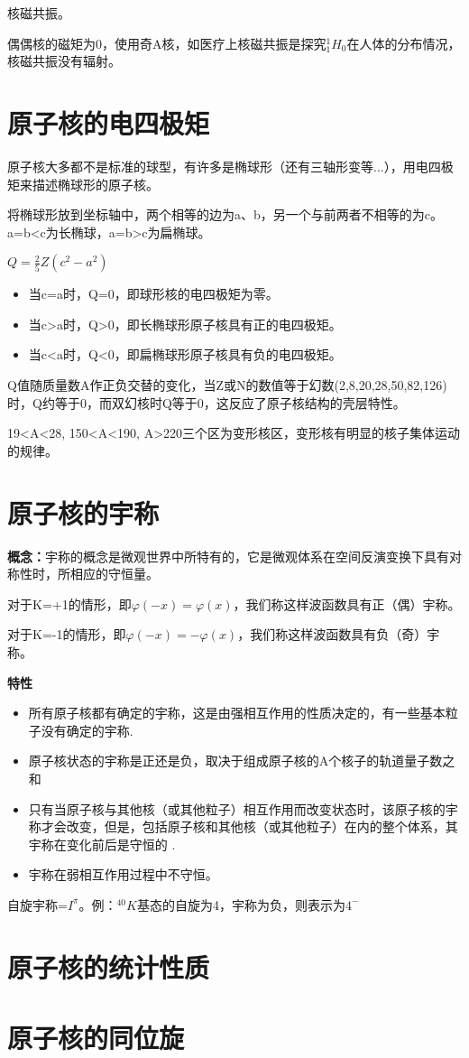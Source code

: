 核磁共振。

偶偶核的磁矩为0，使用奇A核，如医疗上核磁共振是探究$^1_1H_0$在人体的分布情况，核磁共振没有辐射。

\section{原子核的电四极矩}

原子核大多都不是标准的球型，有许多是椭球形（还有三轴形变等...），用电四极矩来描述椭球形的原子核。

将椭球形放到坐标轴中，两个相等的边为a、b，另一个与前两者不相等的为c。a=b<c为长椭球，a=b>c为扁椭球。

$Q=\frac{2}{5}Z(c^2-a^2)$

\begin{itemize}
    \item 当c=a时，Q=0，即球形核的电四极矩为零。
    \item 当c>a时，Q>0，即长椭球形原子核具有正的电四极矩。
    \item 当c<a时，Q<0，即扁椭球形原子核具有负的电四极矩。
\end{itemize}

Q值随质量数A作正负交替的变化，当Z或N的数值等于幻数(2,8,20,28,50,82,126)时，Q约等于0，而双幻核时Q等于0，这反应了原子核结构的壳层特性。

19<A<28, 150<A<190, A>220三个区为变形核区，变形核有明显的核子集体运动的规律。

\section{原子核的宇称}

\textbf{概念：}宇称的概念是微观世界中所特有的，它是微观体系在空间反演变换下具有对称性时，所相应的守恒量。

对于K=+1的情形，即$\varphi (-x) = \varphi (x)$，我们称这样波函数具有正（偶）宇称。

对于K=-1的情形，即$\varphi (-x) = -\varphi (x)$，我们称这样波函数具有负（奇）宇称。

\textbf{特性}

\begin{itemize}
    \item 所有原子核都有确定的宇称，这是由强相互作用的性质决定的，有一些基本粒子没有确定的宇称.
    \item 原子核状态的宇称是正还是负，取决于组成原子核的A个核子的轨道量子数之和
    \item 只有当原子核与其他核（或其他粒子）相互作用而改变状态时，该原子核的宇称才会改变，但是，包括原子核和其他核（或其他粒子）在内的整个体系，其宇称在变化前后是守恒的 .
    \item 宇称在弱相互作用过程中不守恒。
\end{itemize}

自旋宇称=$I^{\pi}$。例：$^{40}K$基态的自旋为4，宇称为负，则表示为$4^{-}$

\section{原子核的统计性质}

\section{原子核的同位旋}

\clearpage
